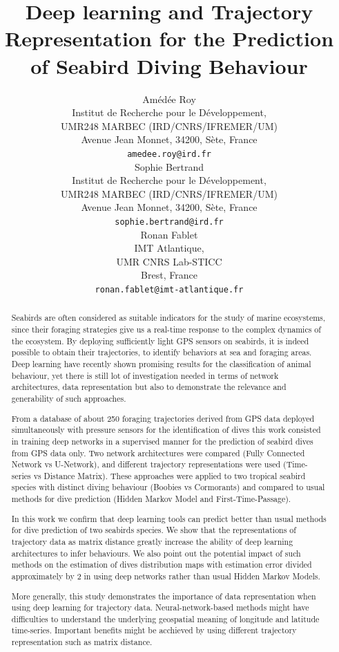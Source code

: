 \documentclass{article}
\title{Deep learning and Trajectory Representation for the Prediction of Seabird Diving Behaviour}
\author{
  Amédée Roy \\
  Institut de Recherche pour le Développement,\\
  UMR248 MARBEC (IRD/CNRS/IFREMER/UM)\\
  Avenue Jean Monnet, 34200, Sète, France \\
  \texttt{amedee.roy@ird.fr} \\
   \And
  Sophie Bertrand \\
  Institut de Recherche pour le Développement,\\
  UMR248 MARBEC (IRD/CNRS/IFREMER/UM)\\
  Avenue Jean Monnet, 34200, Sète, France \\
  \texttt{sophie.bertrand@ird.fr} \\
  \And
  Ronan Fablet \\
  IMT Atlantique,\\
  UMR CNRS Lab-STICC\\
  Brest, France \\
  \texttt{ronan.fablet@imt-atlantique.fr} \\
}
\begin{document}
\maketitle
\linenumbers
\doublespacing

\begin{abstract}

Seabirds are often considered as suitable indicators for the study of marine ecosystems, since their foraging strategies give us a real-time response to the complex dynamics of the ecosystem. By deploying sufficiently light GPS sensors on seabirds, it is indeed possible to obtain their trajectories, to identify behaviors at sea and foraging areas. Deep learning have recently shown promising results for the classification of animal behaviour, yet there is still lot of investigation needed in terms of network architectures, data representation but also to demonstrate the relevance and generability of such approaches.

From a database of about 250 foraging trajectories derived from GPS data deployed simultaneously with pressure sensors for the identification of dives this work consisted in training deep networks in a supervised manner for the prediction of seabird dives from GPS data only. Two network architectures were compared (Fully Connected Network vs U-Network), and different trajectory representations were used (Time-series vs Distance Matrix). These approaches were applied to two tropical seabird species with distinct diving behaviour (Boobies vs Cormorants) and compared to usual methods for dive prediction (Hidden Markov Model and First-Time-Passage).

In this work we confirm that deep learning tools can predict better than  usual methods for dive prediction of two seabirds species. We show that the representations of trajectory data as matrix distance greatly increase the ability of deep learning architectures to infer behaviours. We also point out the potential impact of such methods on the estimation of dives distribution maps with estimation error divided approximately by 2 in using deep networks rather than usual Hidden Markov Models.

More generally, this study demonstrates the importance of data representation when using deep learning for trajectory data. Neural-network-based methods might have difficulties to understand the underlying geospatial meaning of longitude and latitude time-series. Important benefits might be acchieved by using different trajectory representation such as matrix distance.

\end{abstract}
\end{document}
